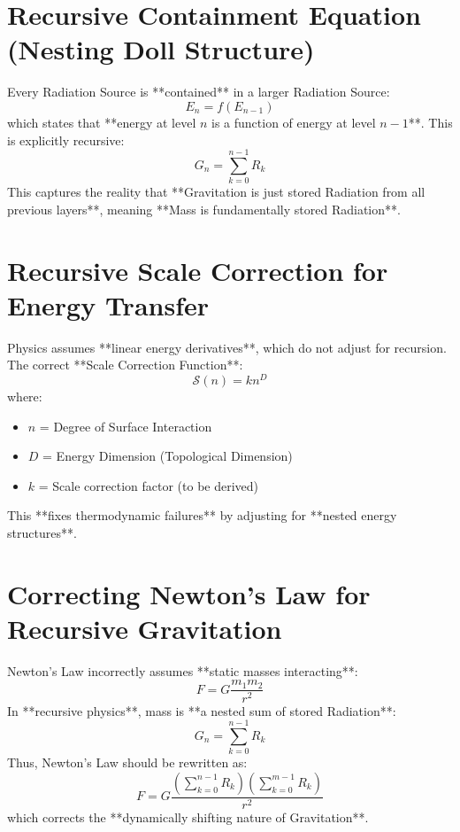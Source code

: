 \documentclass{article}
\begin{document}
\section{Recursive Containment Equation (Nesting Doll Structure)}
Every Radiation Source is **contained** in a larger Radiation Source:
\begin{equation}
E_n = f(E_{n-1})
\end{equation}
which states that **energy at level $n$ is a function of energy at level $n-1$**. This is explicitly recursive:
\begin{equation}
G_n = \sum_{k=0}^{n-1} R_k
\end{equation}
This captures the reality that **Gravitation is just stored Radiation from all previous layers**, meaning **Mass is fundamentally stored Radiation**.

\section{Recursive Scale Correction for Energy Transfer}
Physics assumes **linear energy derivatives**, which do not adjust for recursion. The correct **Scale Correction Function**:
\begin{equation}
\mathcal{S}(n) = k n^D
\end{equation}
where:
\begin{itemize}
    \item $n$ = Degree of Surface Interaction
    \item $D$ = Energy Dimension (Topological Dimension)
    \item $k$ = Scale correction factor (to be derived)
\end{itemize}
This **fixes thermodynamic failures** by adjusting for **nested energy structures**.

\section{Correcting Newton’s Law for Recursive Gravitation}
Newton’s Law incorrectly assumes **static masses interacting**:
\begin{equation}
F = G \frac{m_1 m_2}{r^2}
\end{equation}
In **recursive physics**, mass is **a nested sum of stored Radiation**:
\begin{equation}
G_n = \sum_{k=0}^{n-1} R_k
\end{equation}
Thus, Newton’s Law should be rewritten as:
\begin{equation}
F = G \frac{(\sum_{k=0}^{n-1} R_k)(\sum_{k=0}^{m-1} R_k)}{r^2}
\end{equation}
which corrects the **dynamically shifting nature of Gravitation**.
\end{document}
